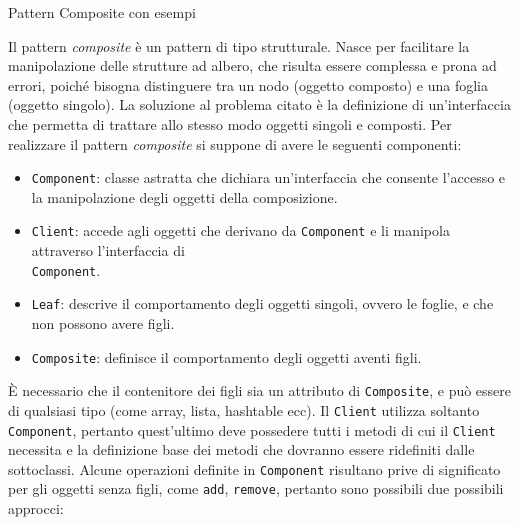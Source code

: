 \begin{problem}{1.22}
Pattern Composite con esempi
\end{problem}
\begin{solution}
Il pattern \textit{composite} è un pattern di tipo strutturale.\newline
Nasce per facilitare la manipolazione delle strutture ad albero, che risulta essere complessa e prona ad errori, poiché bisogna distinguere tra un nodo (oggetto composto) e una foglia (oggetto singolo).
La soluzione al problema citato è la definizione di un'interfaccia che permetta di trattare allo stesso modo oggetti singoli e composti.
Per realizzare il pattern \textit{composite} si suppone di avere le seguenti componenti:
\begin{itemize}
	\item \texttt{Component}: classe astratta che dichiara un'interfaccia che consente l'accesso e la manipolazione degli oggetti della composizione.
	\item \texttt{Client}: accede agli oggetti che derivano da \texttt{Component} e li manipola attraverso l'interfaccia di
	\\\texttt{Component}.
	\item \texttt{Leaf}: descrive il comportamento degli oggetti singoli, ovvero le foglie, e che non possono avere figli.
	\item \texttt{Composite}: definisce il comportamento degli oggetti aventi figli.
\end{itemize}
È necessario che il contenitore dei figli sia un attributo di \texttt{Composite}, e può essere di qualsiasi tipo (come array, lista,
hashtable ecc).
Il \texttt{Client} utilizza soltanto \texttt{Component}, pertanto quest'ultimo deve possedere tutti i metodi di cui il \texttt{Client} necessita e la definizione base dei metodi che dovranno essere ridefiniti dalle sottoclassi.
Alcune operazioni definite in \texttt{Component} risultano prive di significato per gli oggetti senza figli, come \texttt{add}, \texttt{remove}, pertanto sono possibili due possibili approcci:


\end{solution}
